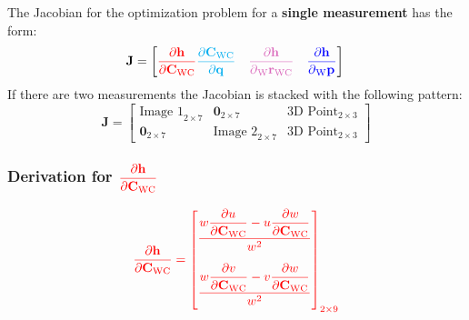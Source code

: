 \documentclass{article}
\renewcommand{\Vec}[1]{{\mathbf{#1}}}
\newcommand{\Mat}[1]{{\mathbf{#1}}}
\newcommand{\Zeros}[2]{{\Vec{0}_{#1\times#2}}}
\newcommand{\quat}{{\Vec{q}}}
\newcommand{\jac}{{\Mat{J}}}
\newcommand{\cam}{{\text{C}}}
\newcommand{\world}{{\text{W}}}
\newcommand{\KineNotationTransform}[3]{{{#1}_{#2#3}}}
\newcommand{\KineNotation}[3]{{{{}_{#2}} {#1}_{#2#3}}}
\newcommand{\KineNotationPart}[3]{{{{}_{#2}} {#1}_{#3}}}
\newcommand{\pos}{{\Vec{r}}}
\newcommand{\Pos}[2]{{\KineNotation{\pos}{#1}{#2}}}
\newcommand{\rot}{{\Mat{C}}}
\newcommand{\Rot}[2]{{\KineNotationTransform{\rot}{#1}{#2}}}
\newcommand{\point}{\Vec{p}}
\newcommand{\Pt}[1]{{\KineNotationPart{\point}{#1}{}}}
\newcommand{\camRot}{{\Rot{\world}{\cam}}}
\newcommand{\camPos}{{\Pos{\world}{\cam}}}
\newcommand{\projFunc}{{\Vec{h}}}
\begin{document}
The Jacobian for the optimization problem for a \textbf{single measurement} has
the form:
%
\begin{equation}
  \jac = \begin{bmatrix}
    \color{red}
    \dfrac{\partial{\projFunc}}{\partial \camRot}
    \color{cyan}
    \dfrac{\partial{\camRot}}{\partial{\quat}} \quad
    \color{Thistle}
    \dfrac{\partial{\projFunc}}{\partial \camPos} \quad
    \color{blue}
    \dfrac{\partial{\projFunc}}{\partial \Pt{\world}}
  \end{bmatrix} \\
\end{equation}
%
If there are two measurements the Jacobian is stacked with the following
pattern:
%
\begin{equation}
  \jac = \begin{bmatrix}
    \text{Image 1}_{2 \times 7}
      & \Zeros{2}{7}
      & \text{3D Point}_{2 \times 3} \\
    \Zeros{2}{7}
      & \text{Image 2}_{2 \times 7}
      & \text{3D Point}_{2 \times 3}
  \end{bmatrix}
\end{equation}


\subsubsection*{Derivation for
$\color{red}
\dfrac{\partial{\projFunc}}{\partial{\camRot}}$}

\begin{align}
  \color{red}
  \dfrac{\partial{\projFunc}}{\partial{\camRot}} =
  \begin{bmatrix}
    \dfrac{
      w \dfrac{\partial{u}}{\partial{\camRot}} -
      u \dfrac{\partial{w}}{\partial{\camRot}}
    }{w^{2}} \vspace{1.0em} \\
    \dfrac{
      w \dfrac{\partial{v}}{\partial{\camRot}} -
      v \dfrac{\partial{w}}{\partial{\camRot}}
    }{w^{2}} \vspace{0.5em}
  \end{bmatrix}_{2 \times 9}
\end{align}
\end{document}
